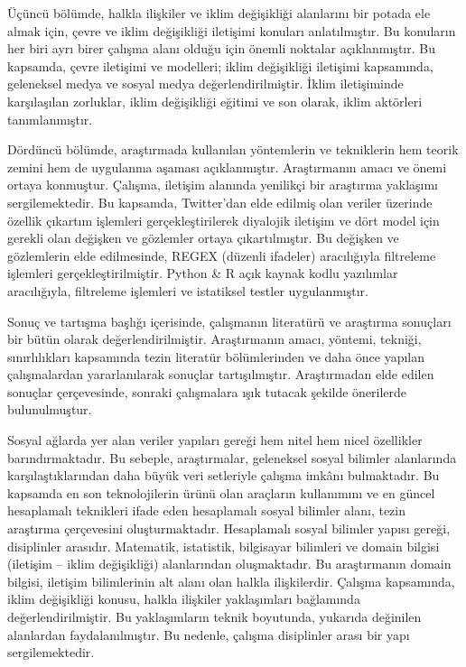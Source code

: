 \documentclass[
]{book}
\begin{document}
Üçüncü bölümde, halkla ilişkiler ve iklim değişikliği alanlarını bir potada ele almak için, çevre ve iklim değişikliği iletişimi konuları anlatılmıştır. Bu konuların her biri ayrı birer çalışma alanı olduğu için önemli noktalar açıklanmıştır. Bu kapsamda, çevre iletişimi ve modelleri; iklim değişikliği iletişimi kapsamında, geleneksel medya ve sosyal medya değerlendirilmiştir. İklim iletişiminde karşılaşılan zorluklar, iklim değişikliği eğitimi ve son olarak, iklim aktörleri tanımlanmıştır.

Dördüncü bölümde, araştırmada kullanılan yöntemlerin ve tekniklerin hem teorik zemini hem de uygulanma aşaması açıklanmıştır. Araştırmanın amacı ve önemi ortaya konmuştur. Çalışma, iletişim alanında yenilikçi bir araştırma yaklaşımı sergilemektedir. Bu kapsamda, Twitter'dan elde edilmiş olan veriler üzerinde özellik çıkartım işlemleri gerçekleştirilerek diyalojik iletişim ve dört model için gerekli olan değişken ve gözlemler ortaya çıkartılmıştır. Bu değişken ve gözlemlerin elde edilmesinde, REGEX (düzenli ifadeler) aracılığıyla filtreleme işlemleri gerçekleştirilmiştir. Python \& R açık kaynak kodlu yazılımlar aracılığıyla, filtreleme işlemleri ve istatiksel testler uygulanmıştır.

Sonuç ve tartışma başlığı içerisinde, çalışmanın literatürü ve araştırma sonuçları bir bütün olarak değerlendirilmiştir. Araştırmanın amacı, yöntemi, tekniği, sınırlılıkları kapsamında tezin literatür bölümlerinden ve daha önce yapılan çalışmalardan yararlanılarak sonuçlar tartışılmıştır. Araştırmadan elde edilen sonuçlar çerçevesinde, sonraki çalışmalara ışık tutacak şekilde önerilerde bulunulmuştur.

Sosyal ağlarda yer alan veriler yapıları gereği hem nitel hem nicel özellikler barındırmaktadır. Bu sebeple, araştırmalar, geleneksel sosyal bilimler alanlarında karşılaştıklarından daha büyük veri setleriyle çalışma imkânı bulmaktadır. Bu kapsamda en son teknolojilerin ürünü olan araçların kullanımını ve en güncel hesaplamalı teknikleri ifade eden hesaplamalı sosyal bilimler alanı, tezin araştırma çerçevesini oluşturmaktadır. Hesaplamalı sosyal bilimler yapısı gereği, disiplinler arasıdır. Matematik, istatistik, bilgisayar bilimleri ve domain bilgisi (iletişim -- iklim değişikliği) alanlarından oluşmaktadır. Bu araştırmanın domain bilgisi, iletişim bilimlerinin alt alanı olan halkla ilişkilerdir. Çalışma kapsamında, iklim değişikliği konusu, halkla ilişkiler yaklaşımları bağlamında değerlendirilmiştir. Bu yaklaşımların teknik boyutunda, yukarıda değinilen alanlardan faydalanılmıştır. Bu nedenle, çalışma disiplinler arası bir yapı sergilemektedir.
\end{document}
